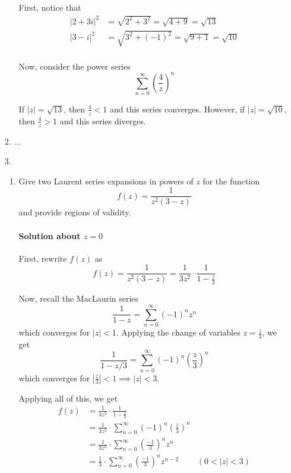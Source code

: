 \documentclass[11pt]{article}
\begin{document}
\begin{enumerate}
\begin{enumerate}
			First, notice that
			\[\begin{aligned}
			|2 + 3i|^2 &= \sqrt{2^2 + 3^2} = \sqrt{4 + 9} = \sqrt{13} \\
			|3 - i|^2 &= \sqrt{3^2 + (-1)^2} = \sqrt{9 + 1} = \sqrt{10} \\
			\end{aligned}\]
			
			Now, consider the power series
			\[
			\sum^{\infty}_{n=0} (\frac{4}{z})^n
			\]
			
			If $|z| = \sqrt{13}$, then $\frac{4}{z} < 1$ and this series converges. However, if $|z| = \sqrt{10}$, then $\frac{4}{z} > 1$ and this series diverges.
		\end{enumerate}
	
	\item[2.] ...
	
	\item[3.]
	
	\begin{enumerate}
		\item Give two Laurent series expansions in powers of $z$ for the function
		\[f(z) = \frac{1}{z^2(3 - z)} \]
		and provide regions of validity.
		
		\paragraph{Solution about $z = 0$}
		First, rewrite $f(z)$ as
		\[f(z) = \frac{1}{z^2(3 - z)} = \frac{1}{3z^2} \cdot \frac{1}{1 - \frac{z}{3}} \]
		
		Now, recall the MacLaurin series
		\[\frac{1}{1 - z} = \sum^{\infty}_{n=0} (-1)^nz^n \]
		which converges for $|z| < 1$. Applying the change of variables $z = \frac{z}{3}$,
		we get
		\[\frac{1}{1 - z/3} = \sum^{\infty}_{n=0} (-1)^n (\frac{z}{3})^n \]
		which converges for $|\frac{z}{3}| < 1 \implies |z| < 3$. 
		
		\bigskip
		
		Applying all of this, we get 
		\[\begin{aligned}
		f(z)
		&= \frac{1}{3z^2} \cdot \frac{1}{1 - \frac{z}{3}} \\
		&= \frac{1}{3z^2} \cdot \sum^{\infty}_{n=0} (-1)^n (\frac{z}{3})^n \\
		&= \frac{1}{3z^2} \cdot \sum^{\infty}_{n=0} (\frac{-1}{3})^n z^n \\
		&= \frac{1}{3} 	  \cdot \sum^{\infty}_{n=0} (\frac{-1}{3})^n z^{n-2}
		& (0 < |z| < 3)\\
		\end{aligned}\]
		

\end{enumerate}
\end{enumerate}
\end{document}
